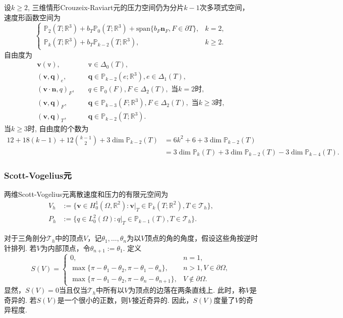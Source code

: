 设$k\geq2$, 三维情形Crouzeix-Raviart元\cite[Example 8.7.2]{BoffiBrezziFortin2013}的压力空间仍为分片$k-1$次多项式空间，
速度形函数空间为
\begin{equation*}
\begin{cases}
\mathbb P_2(T;\mathbb R^3)+b_T\mathbb P_{0}(T;\mathbb R^3)+\mathrm{span}\{b_F\boldsymbol{n}_F, F\in\partial T\}, & k=2,\\
\mathbb P_k(T;\mathbb R^3)+b_T\mathbb P_{k-2}(T;\mathbb R^3), & k\geq2.	
\end{cases}
\end{equation*}
自由度为
\begin{align*}
\boldsymbol{v}(\texttt{v}), &\quad \texttt{v}\in\Delta_0(T), \\
(\boldsymbol{v}, \boldsymbol{q})_e, &\quad \boldsymbol{q}\in\mathbb P_{k-2}(e;\mathbb R^3), e\in\Delta_1(T), \\
(\boldsymbol{v}\cdot\boldsymbol{n}, q)_F, &\quad q\in\mathbb P_{0}(F), F\in\Delta_2(T), \text{ 当$k=2$时},\\
(\boldsymbol{v}, \boldsymbol{q})_F, &\quad \boldsymbol{q}\in\mathbb P_{k-3}(F;\mathbb R^3), F\in\Delta_2(T), \text{ 当$k\geq3$时}, \\
(\boldsymbol{v}, \boldsymbol{q})_T, &\quad \boldsymbol{q}\in\mathbb P_{k-2}(T;\mathbb R^3).
\end{align*}
当$k\geq3$时, 自由度的个数为
\begin{align*}
12+18(k-1)+12{k-1\choose 2}+3\dim\mathbb P_{k-2}(T)&=6k^2+6+3\dim\mathbb P_{k-2}(T)\\
&=3\dim\mathbb P_k(T)+3\dim\mathbb P_{k-2}(T)-3\dim\mathbb P_{k-4}(T).
\end{align*}

\subsubsection{Scott-Vogelius元}

两维Scott-Vogelius元\cite{ScottVogelius1985}离散速度和压力的有限元空间为
\begin{align*}
V_{h}&:=\{\boldsymbol{v}\in H_{0}^{1}(\Omega,\mathbb{R}^{2}): \boldsymbol{v}|_T\in \mathbb P_k(T;\mathbb{R}^{2}), T\in \mathcal{T}_h\},
\\
P_{h}&:=\{q\in L_{0}^2(\Omega): q|_T\in \mathbb P_{k-1}(T), T\in \mathcal{T}_h\}.
\end{align*}

对于三角剖分$\mathcal T_h$中的顶点$V$，记$\theta_1, \ldots, \theta_n$为以$V$顶点的角的角度，假设这些角按逆时针排列. 若$V$为内部顶点，令$\theta_{n+1}:=\theta_1$. 定义 
\begin{equation*}
S(V)=\begin{cases}
0, & n=1,\\
\max\{\pi-\theta_1-\theta_{2},\pi-\theta_1-\theta_{n}\}, & n>1, V\in\partial\Omega, \\
\max\{\pi-\theta_1-\theta_{2},\pi-\theta_{n}-\theta_{n+1}\}, & V\not\in\partial\Omega.
\end{cases}
\end{equation*}
显然，$S(V)=0$当且仅当$\mathcal T_h$中所有以$V$为顶点的边落在两条直线上. 此时，称$V$是奇异的. 若$S(V)$是一个很小的正数，则$V$接近奇异的. 因此，$S(V)$度量了$V$的奇异程度.

